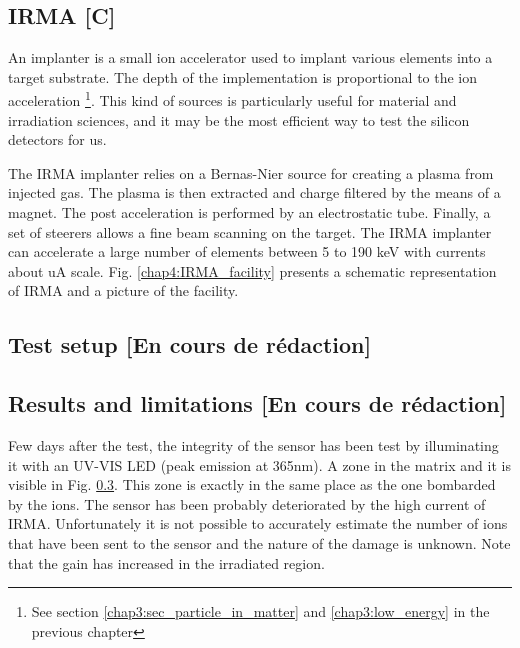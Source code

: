 \begin{refsection}
  \subsection{IRMA [C]}
  An implanter is a small ion accelerator used to implant various elements into a target substrate. The depth of the implementation is proportional to the ion acceleration \footnote{See section \ref{chap3:sec_particle_in_matter} and \ref{chap3:low_energy} in the previous chapter}. This kind of sources is particularly useful for material and irradiation sciences, and it may be the most efficient way to test the silicon detectors for us.

  The IRMA implanter \cite{Chaumont1981} relies on a Bernas-Nier source \cite{Paris1981} for creating a plasma from injected gas. The plasma is then extracted and charge filtered by the means of a magnet. The post acceleration is performed by an electrostatic tube. Finally, a set of steerers allows a fine beam scanning on the target. The IRMA implanter can accelerate a large number of elements between 5 to 190 keV with currents about uA scale. Fig. \ref{chap4:IRMA_facility} presents a schematic representation of IRMA and a picture of the facility.
  
  
  \subsection{Test setup [En cours de rédaction]}
  \cite{advacam2019}
  \cite{Kraus2011}

  
  \subsection{Results and limitations [En cours de rédaction]}
  
  

  Few days after the test, the integrity of the sensor has been test by illuminating it with an UV-VIS LED (peak emission at 365nm). A zone in the matrix and it is visible in Fig. \ref{}. 
  This zone is exactly in the same place as the one bombarded by the ions. The sensor has been probably deteriorated by the high current of IRMA. Unfortunately it is not possible to accurately estimate the number of ions that have been sent to the sensor and the nature of the damage is unknown. Note that the gain has increased in the irradiated region.


\end{refsection}
